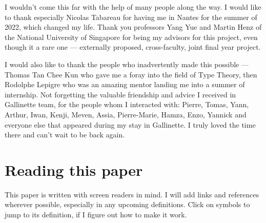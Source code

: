 I wouldn't come this far with the help of many people along the way. I would
like to thank especially Nicolas Tabareau for having me in Nantes for the summer
of 2022, which changed my life. Thank you professors Yang Yue and Martin Henz of
the National University of Singapore for being my advisors for this project,
even though it a rare one --- externally proposed, cross-faculty, joint final
year project.

I would also like to thank the people who inadvertently made this possible ---
Thomas Tan Chee Kun who gave me a foray into the field of Type Theory, then
Rodolphe Lepigre who was an amazing mentor landing me into a summer of internship.
Not forgetting the valuable friendship and advice I received in Gallinette team,
for the people whom I interacted with: Pierre, Tomas, Yann, Arthur, Iwan, Kenji,
Meven, Assia, Pierre-Marie, Hamza, Enzo, Yannick and everyone else that appeared
during my stay in Gallinette. I truly loved the time there and can't wait to be
back again.

\chapter*{Reading this paper}

This paper is written with screen readers in mind. I will add links and
references wherever possible, especially in any upcoming definitions. Click on 
symbols to jump to its definition, if I figure out how to make it work.

\endgroup


\begingroup %

\hypersetup{linkcolor=.} %
\setlength{\textheight}{230\vscale} %

\etocstandarddisplaystyle %
\etocstandardlines %
\setcounter{tocdepth}{\subsectiontocdepth}

\tableofcontents %


\let\cleardoublepage\bigskip
\let\clearpage\bigskip


\endgroup
